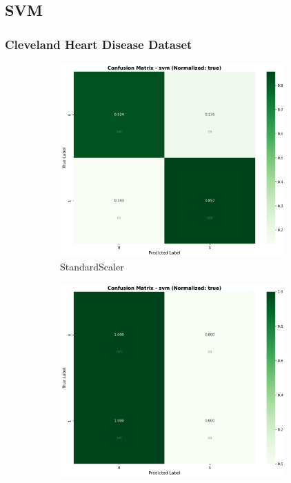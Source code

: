 \FloatBarrier

\subsection{SVM}\label{subsec:svm}

\subsubsection{Cleveland Heart Disease Dataset}\label{subsubsec:svm-cleveland}

\begin{figure}[H]\centering
\begin{subfigure}[b]{0.31\textwidth}\centering
\includegraphics[width=0.95\textwidth]{Result/cleveland_dataset/confusion_matrices/svm_numeric_dataset_StandardScaler.png}
\caption{StandardScaler}\label{fig:svm_clev_cm_standard}
\end{subfigure}\hfill
\begin{subfigure}[b]{0.31\textwidth}\centering
\includegraphics[width=0.95\textwidth]{Result/cleveland_dataset/confusion_matrices/svm_numeric_dataset_MinMaxScaler.png}

\end{subfigure}
\end{figure}
